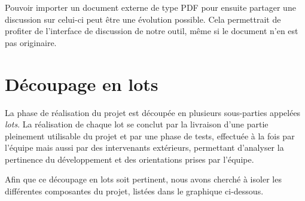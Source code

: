\documentclass[10pt,twocolumn,a4paper,utf8x]{article}
\begin{document}
Pouvoir importer un document externe de type PDF pour ensuite partager
une discussion sur celui-ci peut être une évolution possible. Cela
permettrait de profiter de l'interface de discussion de notre outil,
même si le document n'en est pas originaire.

\section{Découpage en lots}

La phase de réalisation du projet est découpée en plusieurs sous-parties
appelées \emph{lots}. La réalisation de chaque lot se conclut par la
livraison d'une partie pleinement utilisable du projet et par une phase
de tests, effectuée à la fois par l'équipe mais aussi par des
intervenants extérieurs, permettant d'analyser la pertinence du
développement et des orientations prises par l'équipe.

Afin que ce découpage en lots soit pertinent, nous avons cherché à
isoler les différentes composantes du projet, listées dans le graphique
ci-dessous.
\end{document}
